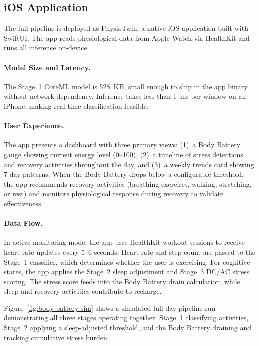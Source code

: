 \documentclass[12pt,letterpaper]{article}
\begin{document}
\subsection{iOS Application}

The full pipeline is deployed as PhysioTwin, a native iOS application built with SwiftUI. The app reads physiological data from Apple Watch via HealthKit and runs all inference on-device.

\paragraph{Model Size and Latency.} The Stage~1 CoreML model is 528~KB, small enough to ship in the app binary without network dependency. Inference takes less than 1~ms per window on an iPhone, making real-time classification feasible.

\paragraph{User Experience.} The app presents a dashboard with three primary views: (1)~a Body Battery gauge showing current energy level (0--100), (2)~a timeline of stress detections and recovery activities throughout the day, and (3)~a weekly trends card showing 7-day patterns. When the Body Battery drops below a configurable threshold, the app recommends recovery activities (breathing exercises, walking, stretching, or rest) and monitors physiological response during recovery to validate effectiveness.

\paragraph{Data Flow.} In active monitoring mode, the app uses HealthKit workout sessions to receive heart rate updates every 5--6 seconds. Heart rate and step count are passed to the Stage~1 classifier, which determines whether the user is exercising. For cognitive states, the app applies the Stage~2 sleep adjustment and Stage~3 DC/AC stress scoring. The stress score feeds into the Body Battery drain calculation, while sleep and recovery activities contribute to recharge.

Figure~\ref{fig:body-battery-sim} shows a simulated full-day pipeline run demonstrating all three stages operating together: Stage~1 classifying activities, Stage~2 applying a sleep-adjusted threshold, and the Body Battery draining and tracking cumulative stress burden.
\end{document}
